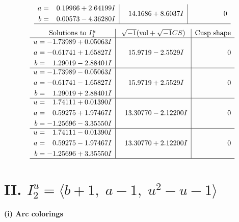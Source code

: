\documentclass[1p]{elsarticle_modified}
\theoremstyle{definition}
\newcommand{\I}{\sqrt{-1}}
\begin{document}
$$\begin{array}{c|c|c}
\begin{aligned}
a &= \phantom{-}0.19966 + 2.64199 I \\
b &= \phantom{-}0.00573 - 4.36280 I\end{aligned}
 & \phantom{-}14.1686 + 8.6037 I & \phantom{-0.000000 } 0\\
 \hline 
 \end{array}$$\newpage$$\begin{array}{c|c|c}  
\text{Solutions to }I^u_{1}& \I (\text{vol} + \sqrt{-1}CS) & \text{Cusp shape}\\
 \hline 
\begin{aligned}
u &= -1.73989 + 0.05063 I \\
a &= -0.61741 + 1.65827 I \\
b &= \phantom{-}1.29019 - 2.88401 I\end{aligned}
 & \phantom{-}15.9719 - 2.5529 I & \phantom{-0.000000 } 0 \\ \hline\begin{aligned}
u &= -1.73989 - 0.05063 I \\
a &= -0.61741 - 1.65827 I \\
b &= \phantom{-}1.29019 + 2.88401 I\end{aligned}
 & \phantom{-}15.9719 + 2.5529 I & \phantom{-0.000000 } 0 \\ \hline\begin{aligned}
u &= \phantom{-}1.74111 + 0.01390 I \\
a &= \phantom{-}0.59275 + 1.97467 I \\
b &= -1.25696 - 3.35550 I\end{aligned}
 & \phantom{-}13.30770 - 2.12200 I & \phantom{-0.000000 } 0 \\ \hline\begin{aligned}
u &= \phantom{-}1.74111 - 0.01390 I \\
a &= \phantom{-}0.59275 - 1.97467 I \\
b &= -1.25696 + 3.35550 I\end{aligned}
 & \phantom{-}13.30770 + 2.12200 I & \phantom{-0.000000 } 0\\
 \hline 
 \end{array}$$\newpage\newpage\renewcommand{\arraystretch}{1}
\centering \section*{II. $I^u_{2}= \langle b+1,\;a-1,\;u^2- u-1 \rangle$}
\flushleft \textbf{(i) Arc colorings}\\
\end{document}
